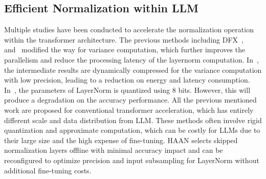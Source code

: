 \subsection{Efficient Normalization within LLM}
\label{sec:bg:related_work}
Multiple studies have been conducted to accelerate the normalization operation within the transformer architecture. The previous methods including DFX~\cite{hong2022dfx}, ~\cite{jeong2023low} and~\cite{lu2020hardware} modified the way for variance computation, which further improves the parallelism and reduce the processing latency of the layernorm computation. 
In~\cite{wang2023sole}, the intermediate results are dynamically compressed for the variance computation with low precision, leading to a reduction on energy and latency consumption. In~\cite{liu2021hardware}, the parameters of LayerNorm is quantized using 8 bits. However, this will produce a degradation on the accuracy performance.
All the previous mentioned work are proposed for conventional transformer acceleration, which has entirely different scale and data distribution from LLM. These methods often involve rigid quantization and approximate computation, which can be costly for LLMs due to their large size and the high expense of fine-tuning. HAAN selects skipped normalization layers offline with minimal accuracy impact and can be reconfigured to optimize precision and input subsampling for LayerNorm without additional fine-tuning costs.